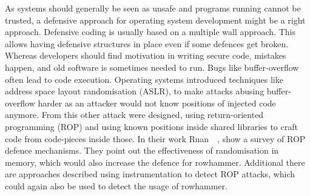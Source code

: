 As systems should generally be seen as unsafe and programs running cannot be
trusted, a defensive approach for operating system development might be a right
approach. Defensive coding is usually based on a multiple wall approach. This
allows having defensive structures in place even if some defences get broken.
Whereas developers should find motivation in writing secure code, mistakes
happen, and old software is sometimes needed to run. Bugs like buffer-overflow
often lead to code execution. Operating systems introduced techniques like
address space layout randomisation (ASLR), to make attacks abusing
buffer-overflow harder as an attacker would not know positions of injected code
anymore. From this other attack were designed, using return-oriented programming
(ROP) and using known positions inside shared libraries to craft code from
code-pieces inside those. In their work Ruan~\etal~\cite{ropsur}, show a survey
of ROP defence mechanisms. They point out the effectiveness of randomisation in
memory, which would also increase the defence for rowhammer. Additional there
are approaches described using instrumentation to detect ROP attacks, which
could again also be used to detect the usage of rowhammer.

